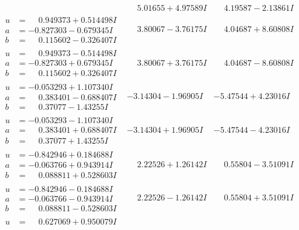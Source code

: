 \documentclass[1p]{elsarticle_modified}
\theoremstyle{definition}
\begin{document}
$$\begin{array}{c|c|c}
 & \phantom{-}5.01655 + 4.97589 I & \phantom{-}4.19587 - 2.13861 I \\ \hline\begin{aligned}
u &= \phantom{-}0.949373 + 0.514498 I \\
a &= -0.827303 - 0.679345 I \\
b &= \phantom{-}0.115602 - 0.326407 I\end{aligned}
 & \phantom{-}3.80067 - 3.76175 I & \phantom{-}4.04687 + 8.60808 I \\ \hline\begin{aligned}
u &= \phantom{-}0.949373 - 0.514498 I \\
a &= -0.827303 + 0.679345 I \\
b &= \phantom{-}0.115602 + 0.326407 I\end{aligned}
 & \phantom{-}3.80067 + 3.76175 I & \phantom{-}4.04687 - 8.60808 I \\ \hline\begin{aligned}
u &= -0.053293 + 1.107340 I \\
a &= \phantom{-}0.383401 - 0.688407 I \\
b &= \phantom{-}0.37077 - 1.43255 I\end{aligned}
 & -3.14304 - 1.96905 I & -5.47544 + 4.23016 I \\ \hline\begin{aligned}
u &= -0.053293 - 1.107340 I \\
a &= \phantom{-}0.383401 + 0.688407 I \\
b &= \phantom{-}0.37077 + 1.43255 I\end{aligned}
 & -3.14304 + 1.96905 I & -5.47544 - 4.23016 I \\ \hline\begin{aligned}
u &= -0.842946 + 0.184688 I \\
a &= -0.063766 + 0.943914 I \\
b &= \phantom{-}0.088811 + 0.528603 I\end{aligned}
 & \phantom{-}2.22526 + 1.26142 I & \phantom{-}0.55804 - 3.51091 I \\ \hline\begin{aligned}
u &= -0.842946 - 0.184688 I \\
a &= -0.063766 - 0.943914 I \\
b &= \phantom{-}0.088811 - 0.528603 I\end{aligned}
 & \phantom{-}2.22526 - 1.26142 I & \phantom{-}0.55804 + 3.51091 I \\ \hline\begin{aligned}
u &= \phantom{-}0.627069 + 0.950079 I \\

\end{aligned}
\end{array}$$
\end{document}
